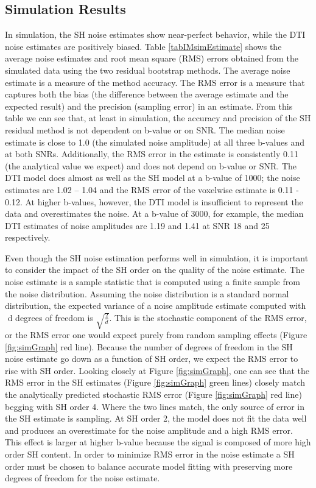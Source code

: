 \subsection{Simulation Results}

In simulation, the SH noise estimates show near-perfect behavior, while
the DTI noise estimates are positively biased. Table \ref{tabIMsimEstimate} shows the average
noise estimates and root mean square (RMS) errors obtained from the
simulated data using the two residual bootstrap methods. The average
noise estimate is a measure of the method accuracy. The RMS error is a
measure that captures both the bias (the difference between the average
estimate and the expected result) and the precision (sampling error) in
an estimate. From this table we can see that, at least in simulation,
the accuracy and precision of the SH residual method is not dependent on
b-value or on SNR. The median noise estimate is close to 1.0 (the
simulated noise amplitude) at all three b-values and at both SNRs.
Additionally, the RMS error in the estimate is consistently 0.11 (the
analytical value we expect) and does not depend on b-value or SNR. The
DTI model does almost as well as the SH model at a b-value of 1000; the
noise estimates are 1.02 -- 1.04 and the RMS error of the voxelwise
estimate is 0.11 - 0.12. At higher b-values, however, the DTI model is
insufficient to represent the data and overestimates the noise. At a
b-value of 3000, for example, the median DTI estimates of noise
amplitudes are 1.19 and 1.41 at SNR 18 and 25 respectively.

Even though the SH noise estimation performs well in simulation, it is
important to consider the impact of the SH order on the quality of the
noise estimate. The noise estimate is a sample statistic that is
computed using a finite sample from the noise distribution. Assuming the
noise distribution is a standard normal distribution, the expected
variance of a noise amplitude estimate computed with\(\text{\ d}\)
degrees of freedom is \(\sqrt{\frac{2}{d}}\). This is the stochastic
component of the RMS error, or the RMS error one would expect purely
from random sampling effects (Figure \ref{fig:simGraph} red line). Because the number of
degrees of freedom in the SH noise estimate go down as a function of SH
order, we expect the RMS error to rise with SH order. Looking closely at
Figure \ref{fig:simGraph}, one can see that the RMS error in the SH estimates (Figure \ref{fig:simGraph}
green lines) closely match the analytically predicted stochastic RMS
error (Figure \ref{fig:simGraph} red line) begging with SH order 4. Where the two lines
match, the only source of error in the SH estimate is sampling. At SH
order 2, the model does not fit the data well and produces an
overestimate for the noise amplitude and a high RMS error. This effect
is larger at higher b-value because the signal is composed of more high
order SH content. In order to minimize RMS error in the noise estimate a
SH order must be chosen to balance accurate model fitting with
preserving more degrees of freedom for the noise estimate.

